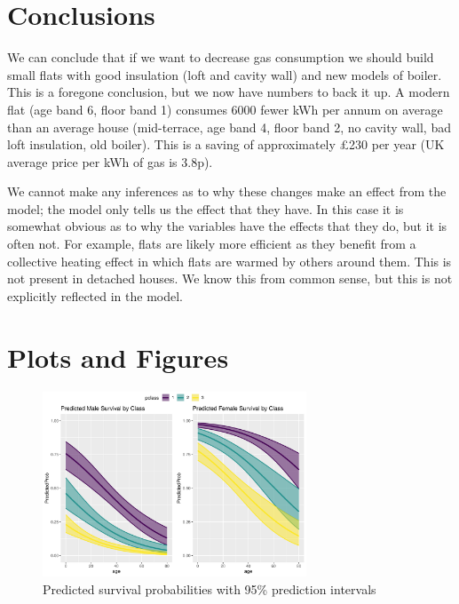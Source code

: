 \documentclass[]{extarticle}
\begin{document}
\section{Conclusions}

We can conclude that if we want to decrease gas consumption we should build small flats with good insulation (loft and cavity wall) and new models of boiler. This is a foregone conclusion, but we now have numbers to back it up. A modern flat (age band 6, floor band 1) consumes 6000 fewer kWh per annum on average than an average house (mid-terrace, age band 4, floor band 2, no cavity wall, bad loft insulation, old boiler). This is a saving of approximately \pounds 230 per year (UK average price per kWh of gas is 3.8p). 

We cannot make any inferences as to why these changes make an effect from the model; the model only tells us the effect that they have. In this case it is somewhat obvious as to why the variables have the effects that they do, but it is often not. For example, flats are likely more efficient as they benefit from a collective heating effect in which flats are warmed by others around them. This is not present in detached houses. We know this from common sense, but this is not explicitly reflected in the model. 
%

\appendix

\section{Plots and Figures}

\begin{figure}[H]
	\centering
	\includegraphics[width=0.7\textwidth]{psurvage}
	\caption{Predicted survival probabilities with 95\% prediction intervals}
	\label{fig:psurvage}
\end{figure}
\end{document}
